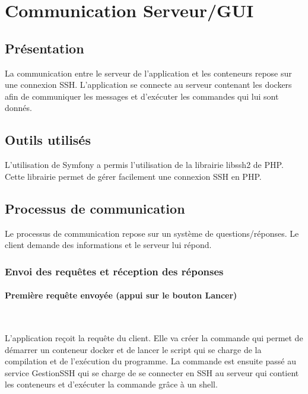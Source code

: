 \section{Communication Serveur/GUI}

\subsection{Présentation}

\par La communication entre le serveur de l'application et les conteneurs repose sur une connexion SSH. L'application se connecte au serveur contenant les dockers afin de communiquer les messages et d'exécuter les commandes qui lui sont donnés.

\subsection{Outils utilisés}

\par L'utilisation de Symfony a permis l'utilisation de la librairie libssh2 de PHP. Cette librairie permet de gérer facilement une connexion SSH en PHP.

\subsection{Processus de communication}

\par Le processus de communication repose sur un système de questions/réponses. Le client demande des informations et le serveur lui répond.

\subsubsection{Envoi des requêtes et réception des réponses}

\paragraph*{Première requête envoyée (appui sur le bouton Lancer)} \

\par L'application reçoit la requête du client. Elle va créer la commande qui permet de démarrer un conteneur docker et de lancer le script qui se charge de la compilation et de l'exécution du programme. La commande est ensuite passé au service GestionSSH qui se charge de se connecter en SSH au serveur qui contient les conteneurs et d'exécuter la commande grâce à un shell. 

